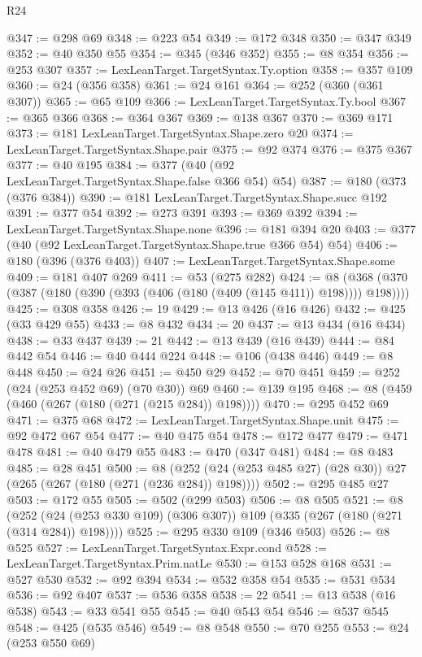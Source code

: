 \begin{lexlean}{R24}
\begin{coremodule}
@347 := @298 @69
@348 := @223 @54
@349 := @172 @348
@350 := @347 @349
@352 := @40 @350 @55
@354 := @345 (@346 @352)
@355 := @8 @354
@356 := @253 @307
@357 := LexLeanTarget.TargetSyntax.Ty.option
@358 := @357 @109
@360 := @24 (@356 @358)
@361 := @24 @161
@364 := @252 (@360 (@361 @307))
@365 := @65 @109
@366 := LexLeanTarget.TargetSyntax.Ty.bool
@367 := @365 @366
@368 := @364 @367
@369 := @138 @367
@370 := @369 @171
@373 := @181 LexLeanTarget.TargetSyntax.Shape.zero @20
@374 := LexLeanTarget.TargetSyntax.Shape.pair
@375 := @92 @374
@376 := @375 @367
@377 := @40 @195
@384 := @377 (@40 (@92 LexLeanTarget.TargetSyntax.Shape.false @366 @54) @54)
@387 := @180 (@373 (@376 @384))
@390 := @181 LexLeanTarget.TargetSyntax.Shape.succ @192
@391 := @377 @54
@392 := @273 @391
@393 := @369 @392
@394 := LexLeanTarget.TargetSyntax.Shape.none
@396 := @181 @394 @20
@403 := @377 (@40 (@92 LexLeanTarget.TargetSyntax.Shape.true @366 @54) @54)
@406 := @180 (@396 (@376 @403))
@407 := LexLeanTarget.TargetSyntax.Shape.some
@409 := @181 @407 @269
@411 := @53 (@275 @282)
@424 := @8 (@368 (@370 (@387 (@180 (@390 (@393 (@406 (@180 (@409 (@145 @411)) @198)))) @198))))
@425 := @308 @358
@426 := 19
@429 := @13 @426 (@16 @426)
@432 := @425 (@33 @429 @55)
@433 := @8 @432
@434 := 20
@437 := @13 @434 (@16 @434)
@438 := @33 @437
@439 := 21
@442 := @13 @439 (@16 @439)
@444 := @84 @442 @54
@446 := @40 @444 @224
@448 := @106 (@438 @446)
@449 := @8 @448
@450 := @24 @26
@451 := @450 @29
@452 := @70 @451
@459 := @252 (@24 (@253 @452 @69) (@70 @30)) @69
@460 := @139 @195
@468 := @8 (@459 (@460 (@267 (@180 (@271 (@215 @284)) @198))))
@470 := @295 @452 @69
@471 := @375 @68
@472 := LexLeanTarget.TargetSyntax.Shape.unit
@475 := @92 @472 @67 @54
@477 := @40 @475 @54
@478 := @172 @477
@479 := @471 @478
@481 := @40 @479 @55
@483 := @470 (@347 @481)
@484 := @8 @483
@485 := @28 @451
@500 := @8 (@252 (@24 (@253 @485 @27) (@28 @30)) @27 (@265 (@267 (@180 (@271 (@236 @284)) @198))))
@502 := @295 @485 @27
@503 := @172 @55
@505 := @502 (@299 @503)
@506 := @8 @505
@521 := @8
    (@252 (@24 (@253 @330 @109) (@306 @307)) @109 (@335 (@267 (@180 (@271 (@314 @284)) @198))))
@525 := @295 @330 @109 (@346 @503)
@526 := @8 @525
@527 := LexLeanTarget.TargetSyntax.Expr.cond
@528 := LexLeanTarget.TargetSyntax.Prim.natLe
@530 := @153 @528 @168
@531 := @527 @530
@532 := @92 @394
@534 := @532 @358 @54
@535 := @531 @534
@536 := @92 @407
@537 := @536 @358
@538 := 22
@541 := @13 @538 (@16 @538)
@543 := @33 @541 @55
@545 := @40 @543 @54
@546 := @537 @545
@548 := @425 (@535 @546)
@549 := @8 @548
@550 := @70 @255
@553 := @24 (@253 @550 @69)

\end{coremodule}
\end{lexlean}
